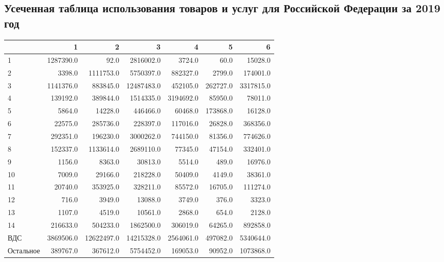 \documentclass[12pt, a4paper]{article}
\begin{document}
\subsection{Усеченная таблица использования товаров и услуг для Российской Федерации за 2019 год}

\begin{tabular}{|l|rrrrrr}
\hline
 &          1 &           2 &           3 &          4 &         5 &          6  \\
\hline
1               &  1287390.0 &        92.0 &   2816002.0 &     3724.0 &      60.0 &    15028.0 \\
2               &     3398.0 &   1111753.0 &   5750397.0 &   882327.0 &    2799.0 &   174001.0 \\
3               &  1141376.0 &    883845.0 &  12487483.0 &   452105.0 &  262727.0 &  3317815.0\\
4               &   139192.0 &    389844.0 &   1514335.0 &  3194692.0 &   85950.0 &    78011.0 \\
5               &     5864.0 &     14228.0 &    446466.0 &    60468.0 &  173868.0 &    16128.0 \\
6               &    22575.0 &    285736.0 &    228397.0 &   117016.0 &   26828.0 &   368356.0 \\
7               &   292351.0 &    196230.0 &   3000262.0 &   744150.0 &   81356.0 &   774626.0\\
8               &   152337.0 &   1133614.0 &   2689110.0 &    77345.0 &   47154.0 &   332401.0\\
9               &     1156.0 &      8363.0 &     30813.0 &     5514.0 &     489.0 &    16976.0 \\
10              &     7009.0 &     29166.0 &    218228.0 &    50409.0 &    4149.0 &    38361.0\\
11              &    20740.0 &    353925.0 &    328211.0 &    85572.0 &   16705.0 &   111274.0\\
12              &      716.0 &      3949.0 &     13088.0 &     3749.0 &     376.0 &     3323.0 \\
13              &     1107.0 &      4519.0 &     10561.0 &     2868.0 &     654.0 &     2128.0 \\
14              &   216633.0 &    504233.0 &   1862500.0 &   306019.0 &   64265.0 &   892858.0 \\
ВДС             &  3869506.0 &  12622497.0 &  14215328.0 &  2564061.0 &  497082.0 &  5340644.0 \\
Остальное &   389767.0 &    367612.0 &   5754452.0 &   169053.0 &   90952.0 &  1073868.0 \\
\end{tabular}
\end{document}

